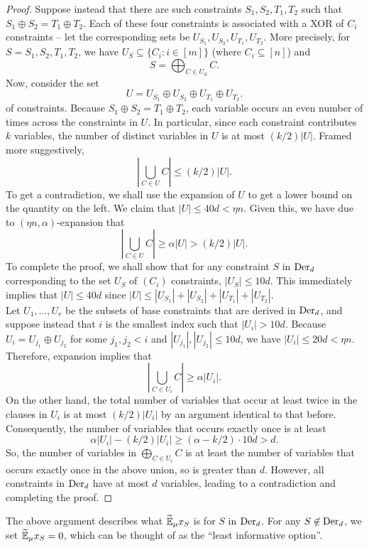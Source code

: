 	\begin{proof}
		Suppose instead that there are such constraints $S_1,S_2,T_1,T_2$ such that $S_1 \oplus S_2 = T_1 \oplus T_2$. Each of these four constraints is associated with a XOR of $C_i$ constraints -- let the corresponding sets be $U_{S_1},U_{S_2},U_{T_1},U_{T_2}$. More precisely, for $S = S_1,S_2,T_1,T_2$, we have $U_S \subseteq \{C_i : i \in [m]\}$ (where $C_i \subseteq [n]$) and
		\[ S = \bigoplus_{C \in U_{S}} C. \]
		Now, consider the set
		\[ U = U_{S_1} \oplus U_{S_2} \oplus U_{T_1} \oplus U_{T_2}. \]
		of constraints. Because $S_1 \oplus S_2 = T_1 \oplus T_2$, each variable occurs an even number of times across the constraints in $U$. In particular, since each constraint contributes $k$ variables, the number of distinct variables in $U$ is at most $(k/2) |U|$. Framed more suggestively,
		\[ \left| \bigcup_{C \in U} C \right| \le (k/2) |U|. \]
		To get a contradiction, we shall use the expansion of $U$ to get a lower bound on the quantity on the left. We claim that $|U| \le 40d < \eta n$. Given this, we have due to $(\eta n, \alpha)$-expansion that
		\[ \left| \bigcup_{C \in U} C \right| \ge \alpha |U| > (k/2) |U|. \]
		To complete the proof, we shall show that for any constraint $S$ in $\operatorname{Der}_d$ corresponding to the set $U_S$ of $(C_i)$ constraints, $|U_S| \le 10d$. This immediately implies that $|U| \le 40d$ since $|U| \le |U_{S_1}| + |U_{S_2}| + |U_{T_1}| + |U_{T_2}|$.\\
		Let $U_1,\ldots,U_r$ be the subsets of base constraints that are derived in $\operatorname{Der}_d$, and suppose instead that $i$ is the smallest index such that $|U_i| > 10d$. Because $U_i = U_{j_1} \oplus U_{j_2}$ for some $j_1,j_2 < i$ and $|U_{j_1}|,|U_{j_2}| \le 10d$, we have $|U_i| \le 20d < \eta n$. Therefore, expansion implies that
		\[ \left| \bigcup_{C \in U_i} C \right| \ge \alpha |U_i|. \]
		On the other hand, the total number of variables that occur at least twice in the clauses in $U_i$ is at most $(k/2) |U_i|$ by an argument identical to that before. Consequently, the number of variables that occurs exactly once is at least
		\[ \alpha |U_i| - (k/2) |U_i| \ge (\alpha - k/2) \cdot 10d > d. \]
		So, the number of variables in $\bigoplus_{C \in U_i} C$ is at least the number of variables that occurs exactly once in the above union, so is greater than $d$. However, all constraints in $\operatorname{Der}_d$ have at most $d$ variables, leading to a contradiction and completing the proof.
	\end{proof}

	The above argument describes what $\widetilde{\mathbb{E}}_\mu x_S$ is for $S$ in $\operatorname{Der}_d$. For any $S \not\in \operatorname{Der}_d$, we set $\widetilde{\mathbb{E}}_\mu x_S = 0$, which can be thought of as the ``least informative option''.\\

